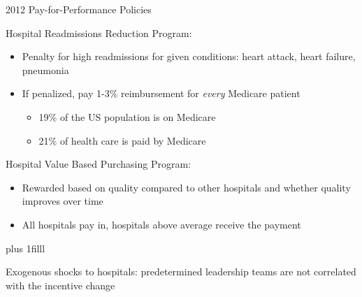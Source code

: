 \documentclass[notes,11pt, aspectratio=169]{beamer}
\newcommand{\btVFill}{\vskip0pt plus 1filll}
\begin{document}
\begin{frame}[noframenumbering]{2012 Pay-for-Performance Policies}\label{policies}
    \vspace{3mm}

    Hospital Readmissions Reduction Program:
    \begin{itemize}
        \item Penalty for high readmissions for given conditions: heart attack, heart failure, pneumonia
        \item If penalized, pay 1-3\% reimbursement for \textit{every} Medicare patient
        \begin{itemize}
            \item 19\% of the US population is on Medicare
            \item 21\% of health care is paid by Medicare
        \end{itemize}
        
    \end{itemize}

    \vspace{5mm}

    Hospital Value Based Purchasing Program:
    \begin{itemize}
        \item Rewarded based on quality compared to other hospitals and whether quality improves over time
        \item All hospitals pay in, hospitals above average receive the payment
    \end{itemize}
    \btVFill

    \begin{block}{}
        Exogenous shocks to hospitals: predetermined leadership teams are not correlated with the incentive change \hyperlink{policies}{}
    \end{block}
\end{frame}
\end{document}
